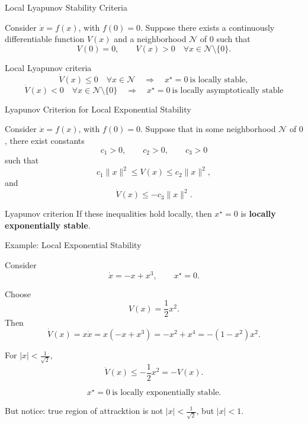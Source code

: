 \documentclass{beamer}
\begin{document}
\begin{frame}{Local Lyapunov Stability Criteria}
	\begin{flushleft}
		Consider $\dot{x}=f(x)$, with $f(0)=0$. Suppose there exists a continuously differentiable function \(V(x)\)
		and a neighborhood \(\mathcal{N}\) of \(0\) such that
		\[
		V(0)=0,
		\qquad
		V(x)>0 \quad \forall x\in\mathcal{N}\setminus\{0\}.
		\]
		
		\hspace*{-0.5cm}
		\begin{minipage}{1.1\textwidth} 
		\begin{block}{Local Lyapunov criteria}
			\[
			\dot V(x)\leq0
			\quad \forall x\in\mathcal{N}
			\quad\Longrightarrow\quad
			x^\star=0\ \text{is locally stable},
			\]
			\[
			\dot V(x)<0
			\quad \forall x\in\mathcal{N}\setminus\{0\}
			\quad\Longrightarrow\quad
			x^\star=0\ \text{is locally asymptotically stable}
			\]
		\end{block}
	\end{minipage}
		
	\end{flushleft}
\end{frame}



\begin{frame}{Lyapunov Criterion for Local Exponential Stability}
	\begin{flushleft}
		Consider $\dot{x}=f(x)$, with $f(0)=0$. Suppose that in some neighborhood \(\mathcal{N}\) of \(0\), there exist
		constants
		\[
		c_1>0,\qquad c_2>0,\qquad c_3>0
		\]
		such that
		\[
		c_1\|x\|^2
		\leq
		V(x)
		\leq
		c_2\|x\|^2,
		\]
		and
		\[
		\dot V(x)
		\leq
		-c_3\|x\|^2.
		\]
		
		\begin{block}{Lyapunov criterion}
			If these inequalities hold locally, then \(x^\star=0\) is
			\textbf{locally exponentially stable}.
		\end{block}
		
	\end{flushleft}
\end{frame}




\begin{frame}{Example: Local Exponential Stability}
	\begin{flushleft}
		Consider
		\[
		\dot{x}=-x+x^3,
		\qquad x^\star=0.
		\]
		
		Choose
		\[
		V(x)=\frac{1}{2}x^2.
		\]
		Then
		\[
		\dot V(x)
		=
		x \dot x
		=
		x(-x+x^3)
		=
		-x^2+x^4
		=
		-(1-x^2)x^2.
		\]
		
		For \(|x|<\frac{1}{\sqrt{2}}\),
		\[
		\dot V(x)\leq-\frac{1}{2}x^2=-V(x).
		\]
		
		\[
		\boxed{x^\star=0\ \text{is locally exponentially stable}.}
		\]
		
		But notice: true region of attracktion is not \(|x|<\frac{1}{\sqrt{2}}\), but \(|x|<1\).
		
	\end{flushleft}
\end{frame}
\end{document}
